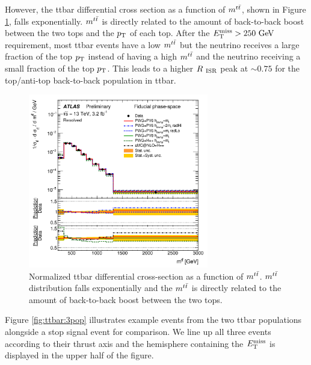 \indent However, the ttbar differential cross section as a function of $m^{t\tbar}$, shown in Figure \ref{fig:ttbar:mtt}, falls exponentially.  $m^{t\tbar}$ is directly related to the amount of back-to-back boost between the two tops and the $p_{\mathrm{T}}$ of each top.  After the $\met > 250 \gev$ requirement, most ttbar events have a low $m^{t\tbar}$ but the neutrino receives a large fraction of the top $p_{\mathrm{T}}$ instead of having a high $m^{t\tbar}$ and the neutrino receiving a small fraction of the top $p_{\mathrm{T}}$.  This leads to a higher $R_{~\mathrm{ISR}}$ peak at $\sim0.75$ for the top/anti-top back-to-back population in ttbar. \\

\begin{figure}[h!]
  \centering
	\includegraphics[width=0.70\textwidth]{./figures/strategy/ttbar_mtt.png}
	\caption[Normalized ttbar differential cross section as a function of $m^{t\tbar}$]{Normalized ttbar differential cross-section as a function of $m^{t\tbar}$.  $m^{t\tbar}$ distribution falls exponentially and the $m^{t\tbar}$ is directly related to the amount of back-to-back boost between the two tops. \cite{ttbarDiffCross} }
\label{fig:ttbar:mtt}
\end{figure}

\indent Figure \ref{fig:ttbar:3pop} illustrates example events from the two ttbar populations alongside a stop signal event for comparison.  We line up all three events according to their thrust axis and the hemisphere containing the $E_{\mathrm{T}}^{\mathrm{miss}}$ is displayed in the upper half of the figure.  \\

